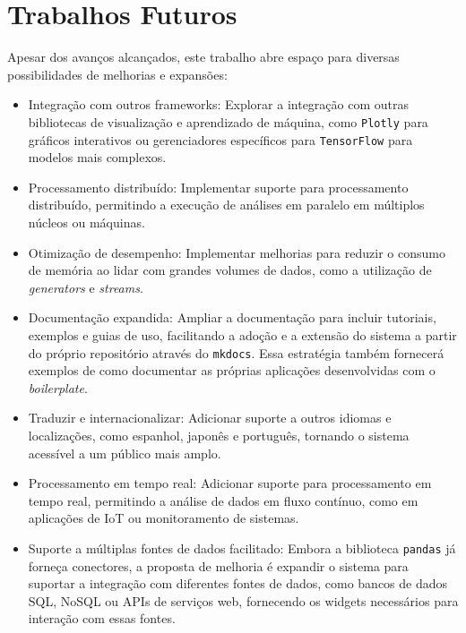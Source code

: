 \section{Trabalhos Futuros}

Apesar dos avanços alcançados, este trabalho abre espaço para diversas possibilidades de melhorias e expansões:

\begin{itemize}
    \item Integração com outros frameworks: Explorar a integração com outras bibliotecas de visualização e aprendizado de máquina, como \texttt{Plotly} para gráficos interativos ou gerenciadores específicos para \texttt{TensorFlow} para modelos mais complexos.

    \item Processamento distribuído: Implementar suporte para processamento distribuído, permitindo a execução de análises em paralelo em múltiplos núcleos ou máquinas.
    
    \item Otimização de desempenho: Implementar melhorias para reduzir o consumo de memória ao lidar com grandes volumes de dados, como a utilização de \textit{generators} e \textit{streams}.

    \item Documentação expandida: Ampliar a documentação para incluir tutoriais, exemplos e guias de uso, facilitando a adoção e a extensão do sistema a partir do próprio repositório através do \texttt{mkdocs}. Essa estratégia também fornecerá exemplos de como documentar as próprias aplicações desenvolvidas com o \textit{boilerplate}.

    \item Traduzir e internacionalizar: Adicionar suporte a outros idiomas e localizações, como espanhol, japonês e português, tornando o sistema acessível a um público mais amplo.

    \item Processamento em tempo real: Adicionar suporte para processamento em tempo real, permitindo a análise de dados em fluxo contínuo, como em aplicações de IoT ou monitoramento de sistemas.

    \item Suporte a múltiplas fontes de dados facilitado: Embora a biblioteca \texttt{pandas} já forneça conectores, a proposta de melhoria é expandir o sistema para suportar a integração com diferentes fontes de dados, como bancos de dados SQL, NoSQL ou APIs de serviços web, fornecendo os widgets necessários para interação com essas fontes.
    

\end{itemize}
